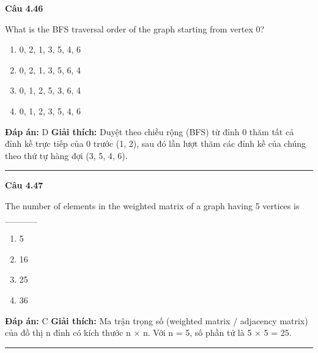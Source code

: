 \documentclass[11pt,a4paper]{article}
\newenvironment{question}[1]{%
  \par\vspace{1em}\noindent\textbf{\large Câu #1}\par\vspace{0.4em}
}{%
  \par\vspace{1em}\hrule\vspace{0.6em}
}
\newenvironment{choices}{%
  \begin{enumerate}[label=\textbf{\Alph*.},leftmargin=2.2em,itemsep=2pt,topsep=3pt]
}{%
  \end{enumerate}
}
\newcommand{\choice}{\item}
\begin{document}
\begin{question}{4.46}
What is the BFS traversal order of the graph starting from vertex 0?
\begin{center}
\end{center}
\begin{choices}
\choice 0, 2, 1, 3, 5, 4, 6
\choice 0, 2, 1, 3, 5, 6, 4
\choice 0, 1, 2, 5, 3, 6, 4
\choice 0, 1, 2, 3, 5, 4, 6
\end{choices}
\textbf{Đáp án:} D
\textbf{Giải thích:} Duyệt theo chiều rộng (BFS) từ đỉnh 0 thăm tất cả đỉnh kề trực tiếp của 0 trước (1, 2), sau đó lần lượt thăm các đỉnh kề của chúng theo thứ tự hàng đợi (3, 5, 4, 6).
\end{question}

\begin{question}{4.47}
The number of elements in the weighted matrix of a graph having 5 vertices is _____
\begin{choices}
\choice 5
\choice 16
\choice 25
\choice 36
\end{choices}
\textbf{Đáp án:} C
\textbf{Giải thích:} Ma trận trọng số (weighted matrix / adjacency matrix) của đồ thị n đỉnh có kích thước n × n. Với n = 5, số phần tử là 5 × 5 = 25.
\end{question}
\end{document}
